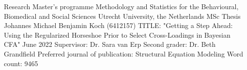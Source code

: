 \thispagestyle{empty}

\begin{large}
\noindent Research Master's programme 
Methodology and Statistics for the Behavioural, Biomedical and Social Sciences \newline
Utrecht University, the Netherlands \newline
\newline
\newline
\newline
\newline
MSc Thesis Johannes Michael Benjamin Koch (6412157) 
\newline
TITLE: "Getting a Step Ahead: Using the Regularized Horseshoe Prior to Select Cross-Loadings in Bayesian CFA"
\newline
June 2022 
\newline
\newline
\newline
\newline
\newline
Supervisor:\newline
Dr. Sara van Erp \newline
\newline
\newline
Second grader: \newline
Dr. Beth Grandfield
\newline
\newline
\newline
\newline
Preferred journal of publication: Structural Equation Modeling
\newline
Word count: 9465
\newline
\end{large}
\addtocounter{page}{-1}
\clearpage
\pagebreak